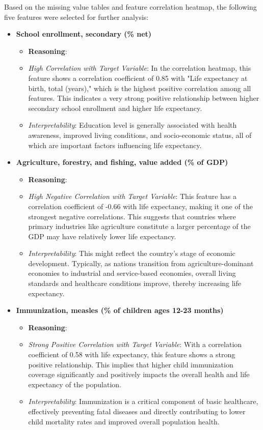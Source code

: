 \documentclass{article}
\begin{document}
Based on the missing value tables and feature correlation heatmap, the following five 
features were selected for further analysis:

\begin{itemize}
    \item \textbf{School enrollment, secondary (\% net)}
    \begin{itemize}
        \item \textbf{Reasoning}:
        \item \textit{High Correlation with Target Variable}: In the correlation heatmap, this feature shows a correlation coefficient of 0.85 with "Life expectancy at birth, total (years)," which is the highest positive correlation among all features. This indicates a very strong positive relationship between higher secondary school enrollment and higher life expectancy.
        \item \textit{Interpretability}: Education level is generally associated with health awareness, improved living conditions, and socio-economic status, all of which are important factors influencing life expectancy.
    \end{itemize}

    \item \textbf{Agriculture, forestry, and fishing, value added (\% of GDP)}
    \begin{itemize}
        \item \textbf{Reasoning}:
        \item \textit{High Negative Correlation with Target Variable}: This feature has a correlation coefficient of -0.66 with life expectancy, making it one of the strongest negative correlations. This suggests that countries where primary industries like agriculture constitute a larger percentage of the GDP may have relatively lower life expectancy.
        \item \textit{Interpretability}: This might reflect the country's stage of economic development. Typically, as nations transition from agriculture-dominant economies to industrial and service-based economies, overall living standards and healthcare conditions improve, thereby increasing life expectancy.
    \end{itemize}

    \item \textbf{Immunization, measles (\% of children ages 12-23 months)}
    \begin{itemize}
        \item \textbf{Reasoning}:
        \item \textit{Strong Positive Correlation with Target Variable}: With a correlation coefficient of 0.58 with life expectancy, this feature shows a strong positive relationship. This implies that higher child immunization coverage significantly and positively impacts the overall health and life expectancy of the population.
        \item \textit{Interpretability}: Immunization is a critical component of basic healthcare, effectively preventing fatal diseases and directly contributing to lower child mortality rates and improved overall population health.
    \end{itemize}


\end{itemize}
\end{document}
